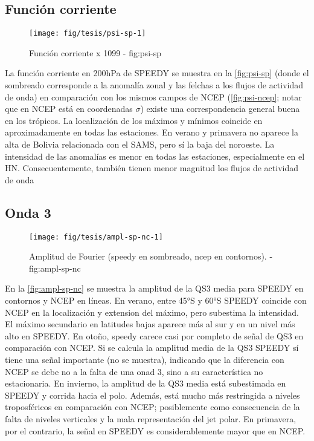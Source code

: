 \documentclass[spanish,a4paper,12p]{book}
\begin{document}
\subsection{Función corriente}\label{funcion-corriente-2}

\begin{landscape}\begin{figure}

{\centering \texttt{[image: fig/tesis/psi-sp-1]} 

}

\caption{Función corriente x 1099 - fig:psi-sp}\label{fig:psi-sp}
\end{figure}
\end{landscape}

La función corriente en 200hPa de SPEEDY se muestra en la
\autoref{fig:psi-sp} (donde el sombreado corresponde a la anomalía zonal
y las felchas a los flujos de actividad de onda) en comparación con los
mismos campos de NCEP (\autoref{fig:psi-ncep}; notar que en NCEP está en
coordenadas \(\sigma\)) existe una correspondencia general buena en los
trópicos. La localización de los máximos y mínimos coincide en
aproximadamente en todas las estaciones. En verano y primavera no
aparece la alta de Bolivia relacionada con el SAMS, pero sí la baja del
noroeste. La intensidad de las anomalías es menor en todas las
estaciones, especialmente en el HN. Consecuentemente, también tienen
menor magnitud los flujos de actividad de onda

\subsection{Onda 3}\label{onda-3-1}

\begin{figure*}
\texttt{[image: fig/tesis/ampl-sp-nc-1]} \caption{Amplitud de Fourier (speedy en sombreado, ncep en contornos). - fig:ampl-sp-nc}\label{fig:ampl-sp-nc}
\end{figure*}

En la \autoref{fig:ampl-sp-nc} se muestra la amplitud de la QS3 media
para SPEEDY en contornos y NCEP en líneas. En verano, entre 45°S y 60°S
SPEEDY coincide con NCEP en la localización y extension del máximo, pero
subestima la intensidad. El máximo secundario en latitudes bajas aparece
más al sur y en un nivel más alto en SPEEDY. En otoño, speedy carece
casi por completo de señal de QS3 en comparación con NCEP. Si se calcula
la amplitud media de la QS3 SPEEDY sí tiene una señal importante (no se
muestra), indicando que la diferencia con NCEP se debe no a la falta de
una onad 3, sino a su característica no estacionaria. En invierno, la
amplitud de la QS3 media está subestimada en SPEEDY y corrida hacia el
polo. Además, está mucho más restringida a niveles troposféricos en
comparación con NCEP; posiblemente como consecuencia de la falta de
niveles verticales y la mala representación del jet polar. En primavera,
por el contrario, la señal en SPEEDY es considerablemente mayor que en
NCEP.
\end{document}
